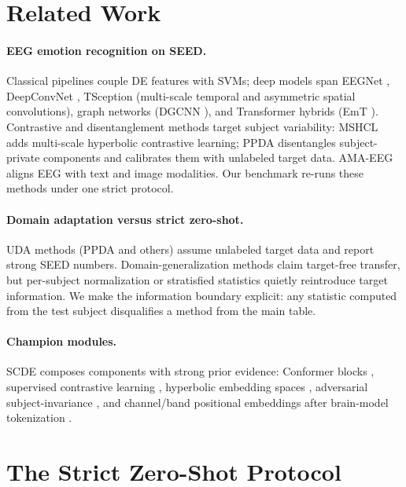 \documentclass{article}
\newcommand{\method}{SCDE}
\begin{document}
\section{Related Work}
\label{sec:related}

\paragraph{EEG emotion recognition on SEED.} Classical pipelines couple DE
features \citep{duan2013de} with SVMs; deep models span EEGNet
\citep{lawhern2018eegnet}, DeepConvNet \citep{schirrmeister2017deep},
TSception \citep{ding2023tsception} (multi-scale temporal and asymmetric
spatial convolutions), graph networks (DGCNN \citep{li2020dgcnn}), and
Transformer hybrids (EmT \citep{ding2025emt}). Contrastive and
disentanglement methods target subject variability: MSHCL
\citep{chang2025mshcl} adds multi-scale hyperbolic contrastive learning;
PPDA \citep{zhao2021ppda} disentangles subject-private components and
calibrates them with unlabeled target data. AMA-EEG \citep{liu2026amaeeg}
aligns EEG with text and image modalities. Our benchmark re-runs these
methods under one strict protocol.

\paragraph{Domain adaptation versus strict zero-shot.} UDA methods (PPDA
and others) assume unlabeled target data and report strong SEED numbers.
Domain-generalization methods claim target-free transfer, but per-subject
normalization or stratisfied statistics quietly reintroduce target
information. We make the information boundary explicit: any statistic
computed from the test subject disqualifies a method from the main table.

\paragraph{Champion modules.} \method{} composes components with strong
prior evidence: Conformer blocks \citep{gulati2020conformer}, supervised
contrastive learning \citep{khosla2020supcon}, hyperbolic embedding spaces
\citep{chang2025mshcl}, adversarial subject-invariance \citep{ganin2016dann},
and channel/band positional embeddings after brain-model tokenization
\citep{jiang2024labram}.

\section{The Strict Zero-Shot Protocol}
\label{sec:protocol}
\end{document}
